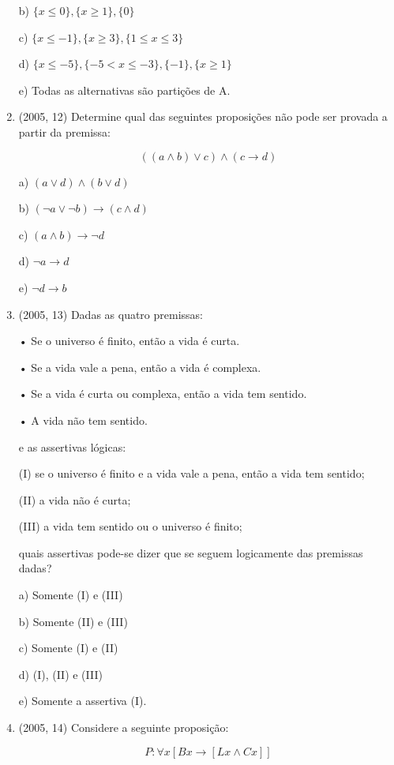 \documentclass{article}
\begin{document}
\begin{enumerate}
b) $\{x \leq 0\},\{x \geq 1\},\{0\}$

c) $\{x \leq-1\},\{x \geq 3\},\{1 \leq x \leq 3\}$

d) $\{x \leq-5\},\{-5<x \leq-3\},\{-1\},\{x \geq 1\}$

e) Todas as alternativas são partições de A.




\item(2005, 12) Determine qual das seguintes proposições não pode ser provada a partir da premissa:

$$((a \wedge b) \vee c) \wedge(c \rightarrow d)$$

a) $(a \vee d) \wedge(b \vee d)$

b) $(\neg a \vee \neg b) \rightarrow(c \wedge d)$

c) $(a \wedge b) \rightarrow \neg d$

d) $\neg a \rightarrow d$

e) $\neg d \rightarrow b$ \newline



\item(2005, 13) Dadas as quatro premissas:

• Se o universo é finito, então a vida é curta.

• Se a vida vale a pena, então a vida é complexa.

• Se a vida é curta ou complexa, então a vida tem sentido.

• A vida não tem sentido.

e as assertivas lógicas:

(I) se o universo é finito e a vida vale a pena, então a vida tem sentido;

(II) a vida não é curta;

(III) a vida tem sentido ou o universo é finito;

quais assertivas pode-se dizer que se seguem logicamente das premissas dadas?

a) Somente (I) e (III)

b) Somente (II) e (III)

c) Somente (I) e (II)

d) (I), (II) e (III)

e) Somente a assertiva (I).\newline


\item(2005, 14) Considere a seguinte proposição: 

$$P : \forall x[B x \rightarrow[L x \wedge C x]]$$


\end{enumerate}
\end{document}
